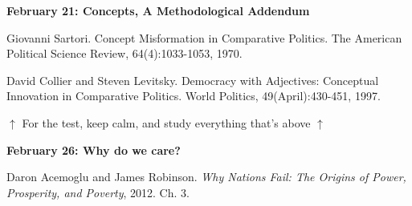 \documentclass[letterpaper]{article}
\renewenvironment{itemize}{
  \begin{list}{}{
    \setlength{\leftmargin}{1.5em}
  }
}{
  \end{list}
}
\begin{document}
\begin{enumerate}
\begin{itemize}
\begin{itemize}
			\end{itemize}



		\item {\bf February 21: Concepts, A Methodological Addendum}
			\begin{itemize}
				\item[$\bullet$] Giovanni Sartori. Concept Misformation in Comparative Politics. The American Political Science Review, 64(4):1033-1053, 1970.
				\item[$\bullet$] David Collier and Steven Levitsky. Democracy with Adjectives: Conceptual Innovation in Comparative Politics. World Politics, 49(April):430-451, 1997.
			\end{itemize}
		
	
	\end{itemize}

\vspace{3mm}

	\begin{center}$\uparrow$ {\color{blue}For the test, keep calm, and study everything that's above} $\uparrow$\end{center}
	\begin{center}\Smiley{}\end{center}


	\begin{itemize} 
		\item[] {\bf February 26: Why do we care?}
			\begin{itemize} 
				\item[$\bullet$] Daron Acemoglu and James Robinson. \emph{Why Nations Fail: The Origins of Power, Prosperity, and Poverty}, 2012. Ch. 3.
			\end{itemize}
	\end{itemize}


\end{enumerate}
\end{document}
